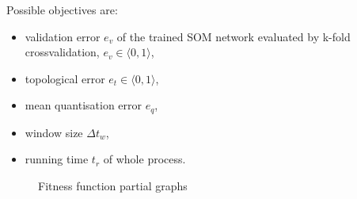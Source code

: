 \documentclass[a4paper,jurnal]{IEEEtran}
\begin{document}
Possible objectives are:%
\begin{itemize}
	\item validation error $ e_v $ of the trained SOM network evaluated by k-fold
	crossvalidation, $ e_v \in \langle 0, 1 \rangle $,
	\item topological error $ e_t \in \langle 0, 1 \rangle $,
	\item mean quantisation error $ e_q $,
	\item window size $ \Delta t_w $,
	\item running time $ t_r $ of whole process.
\end{itemize}
\begin{figure}[h] %
  \centering
  
  \caption{Fitness function partial graphs}
  \label{fig:fit}
\end{figure}
\end{document}
